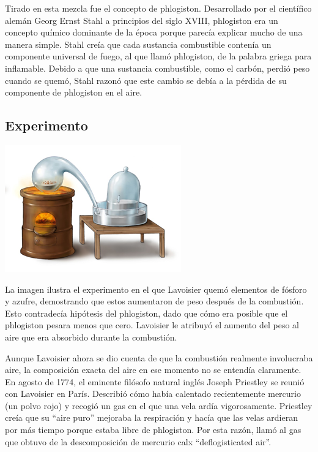 \documentclass[letterpaper, 10pt, journal]{IEEEtran}
\begin{document}
Tirado en esta mezcla fue el concepto de phlogiston. Desarrollado por el científico alemán Georg Ernst Stahl a principios del siglo XVIII, phlogiston era un concepto químico dominante de la época porque parecía explicar mucho de una manera simple. Stahl creía que cada sustancia combustible contenía un componente universal de fuego, al que llamó phlogiston, de la palabra griega para inflamable. Debido a que una sustancia combustible, como el carbón, perdió peso cuando se quemó, Stahl razonó que este cambio se debía a la pérdida de su componente de phlogiston en el aire.

\subsection{Experimento}
\includegraphics[scale=1.5]{caldera}

La imagen ilustra el experimento en el que Lavoisier quemó elementos de fósforo y azufre, demostrando que estos aumentaron de peso después de la combustión. Esto contradecía hipótesis del phlogiston, dado que cómo era posible que el phlogiston pesara menos que cero. Lavoisier le atribuyó el aumento del peso al aire que era absorbido durante la combustión.

Aunque Lavoisier ahora se dio cuenta de que la combustión realmente involucraba aire, la composición exacta del aire en ese momento no se entendía claramente. En agosto de 1774, el eminente filósofo natural inglés Joseph Priestley se reunió con Lavoisier en París. Describió cómo había calentado recientemente mercurio (un polvo rojo) y recogió un gas en el que una vela ardía vigorosamente. Priestley creía que su \textquotedblleft{}aire puro\textquotedblright{} mejoraba la respiración y hacía que las velas ardieran por más tiempo porque estaba libre de phlogiston. Por esta razón, llamó al gas que obtuvo de la descomposición de mercurio calx \textquotedblleft{}deflogisticated air\textquotedblright{}.
\end{document}
